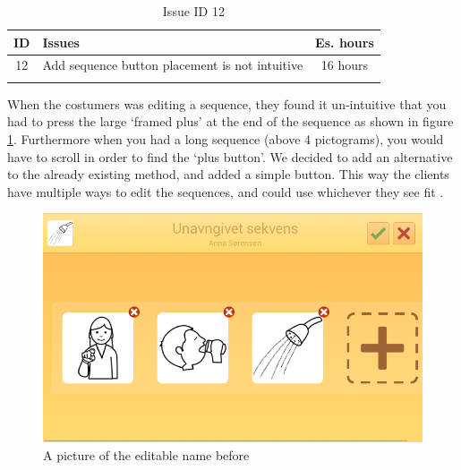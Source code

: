 \begin{longtable} { | c | p{12cm} | c | } 
\hline
	ID 	&	Issues	&		 Es. hours \\\hline
	12 	&	Add sequence button placement is not intuitive	&	16 hours \\\hline
\caption{Issue ID 12}
\label{tab:spr3_addsequencenotintuitive}
\end{longtable}

When the costumers was editing a sequence, they found it un-intuitive that you had to press the large `framed plus' at the end of the sequence as shown in figure \ref{fig:Old_editSequence}. Furthermore when you had a long sequence (above 4 pictograms), you would have to scroll in order to find the `plus button'. We decided to add an alternative to the already existing method, and added a simple button. This way the clients have multiple ways to edit the sequences, and could use whichever they see fit .

\begin{figure} [h!]
\centering
\begin{minipage}{.7\textwidth}
\centering
\includegraphics{Pics/Sprint3/EditModeCropped}
\caption{A picture of the editable name before}
\label{fig:Old_editSequence}
\end{minipage}\hfill
\end{figure}